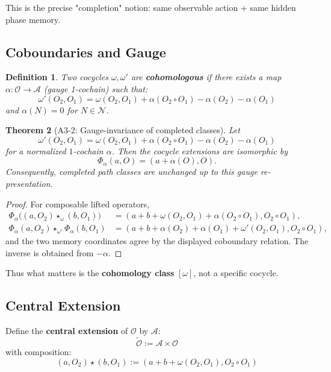 \documentclass[12pt, oneside]{article}
\newtheorem{theorem}{Theorem}[section]
\newtheorem{definition}[theorem]{Definition}
\newcommand{\N}{\mathcal{N}}
\newcommand{\A}{\mathcal{A}}
\newcommand{\Opr}{\mathcal{O}}
\newcommand{\wtilde}{\widetilde}
\begin{document}
This is the precise "completion" notion: same observable action + same hidden phase memory.

\subsection{Coboundaries and Gauge}

\begin{definition}
Two cocycles $\omega, \omega'$ are \textbf{cohomologous} if there exists a map $\alpha: \Opr \rightarrow \A$ (gauge 1-cochain) such that:
\begin{equation}
\omega'(O_2, O_1) = \omega(O_2, O_1) + \alpha(O_2 \circ O_1) - \alpha(O_2) - \alpha(O_1)
\end{equation}
and $\alpha(N) = 0$ for $N \in \N$.
\end{definition}

\begin{theorem}[A3-2: Gauge-invariance of completed classes]
Let
\[
\omega'(O_2,O_1)=\omega(O_2,O_1)+\alpha(O_2\circ O_1)-\alpha(O_2)-\alpha(O_1)
\]
for a normalized $1$-cochain $\alpha$. Then the cocycle extensions are isomorphic by
\[
\Phi_\alpha(a,O)=(a+\alpha(O),O).
\]
Consequently, completed path classes are unchanged up to this gauge re-presentation.
\end{theorem}

\begin{proof}
For composable lifted operators,
\[
\begin{aligned}
\Phi_\alpha\bigl((a,O_2)\star_\omega(b,O_1)\bigr)
&=(a+b+\omega(O_2,O_1)+\alpha(O_2\circ O_1),O_2\circ O_1),\\
\Phi_\alpha(a,O_2)\star_{\omega'}\Phi_\alpha(b,O_1)
&=(a+b+\alpha(O_2)+\alpha(O_1)+\omega'(O_2,O_1),O_2\circ O_1),
\end{aligned}
\]
and the two memory coordinates agree by the displayed coboundary relation. The inverse is obtained from $-\alpha$.
\end{proof}

Thus what matters is the \textbf{cohomology class} $[\omega]$, not a specific cocycle.

\subsection{Central Extension}

Define the \textbf{central extension} of $\Opr$ by $\A$:
\begin{equation}
\wtilde{\Opr} := \A \times \Opr
\end{equation}
with composition:
\begin{equation}
(a, O_2) \star (b, O_1) := (a + b + \omega(O_2, O_1), O_2 \circ O_1)
\end{equation}
\end{document}

